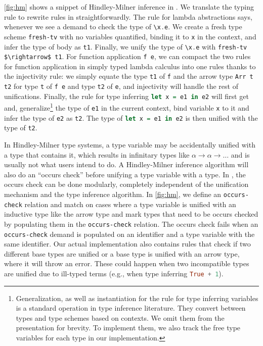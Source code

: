 \autoref{fig:hm} shows a snippet of Hindley-Milner inference in \egglog.
We translate the typing rule to rewrite rules in \egglog straightforwardly.
The \egglog rule for lambda abstractions says,
 whenever we see a demand to check the type of \lstinline[language=Haskell]{\x.e}.
We create a fresh type scheme \lstinline{fresh-tv} with no variables quantified,
 binding it to \lstinline{x} in the context, and infer the type of body as \lstinline{t1}.
Finally, we unify the type of  \lstinline[language=Haskell]{\x.e} with
 \lstinline[mathescape=true]{fresh-tv $\rightarrow$ t1}.
For function application \lstinline{f e},
 we can compact the two rules
 for function application in simply typed lambda calculus into one rules
 thanks to the injectivity rule:
 we simply equate the type \lstinline{t1} of \lstinline{f} and the arrow type \lstinline{Arr t t2}
 for type \lstinline{t} of \lstinline{f e} and type \lstinline{t2} of \lstinline{e},
 and injectivity will handle the rest of unifications.
Finally, the rule for type inferring \lstinline[language=Haskell]{let x = e1 in e2}
 will first get and,
 generalize\footnote{
    Generalization, as well as instantiation for the rule for type inferring variables
    is a standard operation in type inference literature.
    They convert between types and type schemes based on contexts.
    We omit them from the presentation for brevity.
    To implement them, we also track the free type variables
    for each type
    in our implementation.
 } the type of \lstinline{e1} in the current context,
 bind variable \lstinline{x} to it
 and infer the type of \lstinline{e2} as \lstinline{t2}.
The type of \lstinline[language=Haskell]{let x = e1 in e2}
 is then unified with the type of \lstinline{t2}.

In Hindley-Milner type systems,
 a type variable may be accidentally unified
 with a type that contains it, which results in infinitary types
 like $\alpha\rightarrow\alpha\rightarrow\ldots$ and is usually
 not what users intend to do.
A Hindley-Milner inference algorithm will also
 do an ``occurs check'' before
 unifying a type variable with a type.
In \egglog, the occurs check can be done modularly,
 completely independent of the unification mechanism
 and the type inference algorithm.
In \autoref{fig:hm},
 we define an \lstinline{occurs-check} relation
 and match on cases where a type variable
 is unified with an inductive type like the arrow type
 and mark types that need to be occurs checked by
 populating them in the \lstinline{occurs-check} relation.
The occurs check fails when an \lstinline{occurs-check} demand
 is populated on an identifier and a type variable with the same identifier.
Our actual implementation also contains rules that
 check if two different base types are unified or
 a base type is unified with an arrow type,
 where it will throw an error.
These could happen when two incompatible types are unified
 due to ill-typed terms
 (e.g., when type inferring \lstinline[language=Haskell]{True + 1}).

